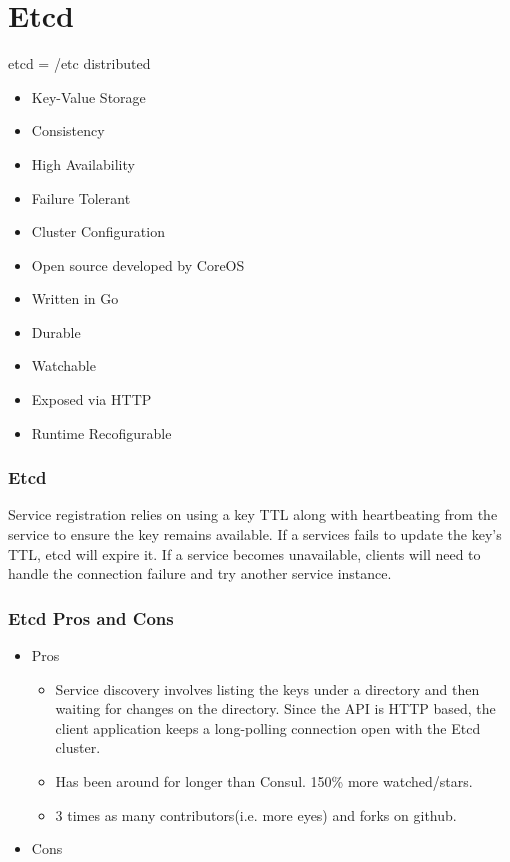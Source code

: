 \section{Etcd}

\begin{frame}
etcd = /etc distributed
\begin{itemize}
    \item Key-Value Storage
    \item Consistency
    \item High Availability
    \item Failure Tolerant
    \item Cluster Configuration
\end{itemize}
\end{frame}


\begin{frame}
\begin{itemize}
    \item Open source developed by CoreOS
    \item Written in Go
    \item Durable
    \item Watchable
    \item Exposed via HTTP
    \item Runtime Recofigurable
\end{itemize}
\end{frame}

\begin{frame}
    \frametitle{Etcd}

Service registration relies on using a key TTL along with heartbeating from the service to ensure the key remains available. If a services fails to update the key's TTL, etcd will expire it. If a service becomes unavailable, clients will need to handle the connection failure and try another service instance.

\end{frame}

\begin{frame}
    \frametitle{Etcd Pros and Cons}

\begin{itemize}
    \item Pros
        \begin{itemize}
            \item Service discovery involves listing the keys under a directory and then waiting for changes on the directory. Since the API is HTTP based, the client application keeps a long-polling connection open with the Etcd cluster.
            \item Has been around for longer than Consul. 150\% more watched/stars.
            \item 3 times as many contributors(i.e. more eyes) and forks on github.
        \end{itemize}
    \item Cons
\end{itemize}
\end{frame}

